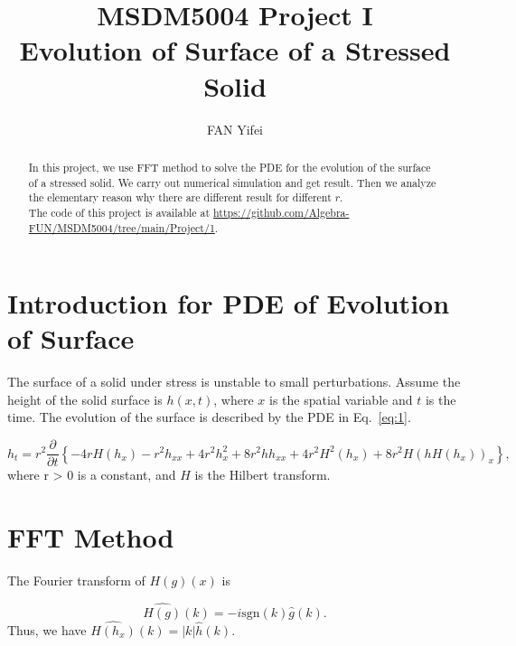 \documentclass[runningheads]{llncs}
\begin{document}
\title{
    MSDM5004 Project I\\
    Evolution of Surface of a Stressed Solid}
\author{FAN Yifei}
\maketitle

\begin{abstract}
    In this project, we use FFT method to solve the PDE for the evolution of the surface of a stressed solid. 
    We carry out numerical simulation and get result. 
    Then we analyze the elementary reason why there are different result for different $r$.\\
    The code of this project is available at \url{https://github.com/Algebra-FUN/MSDM5004/tree/main/Project/1}.
\end{abstract}

\section{Introduction for PDE of Evolution of Surface}

The surface of a solid under stress is unstable to small perturbations. 
Assume the height of the solid surface is $h(x, t)$, where $x$ is the spatial variable and $t$ is the time. 
The evolution of the surface is described by the PDE in Eq.~\eqref{eq:1}.

\begin{equation}
    \label{eq:1}
    h_t = r^2\frac{\partial}{\partial t}\left\{ -4rH(h_x)-r^2h_{xx}+4r^2h_x^2+8r^2hh_{xx}+4r^2H^2(h_x)+8r^2H(hH(h_x))_x\right\},
\end{equation}
where r > 0 is a constant, and $H$ is the Hilbert transform.

\section{FFT Method}

The Fourier transform of $H(g)(x)$ is

\begin{equation}
    \widehat{H(g)}(k)=-i\mbox{sgn}(k)\hat{g}(k).
\end{equation}
Thus, we have $\widehat{H(h_x)}(k)=|k|\hat{h}(k)$.
\end{document}
